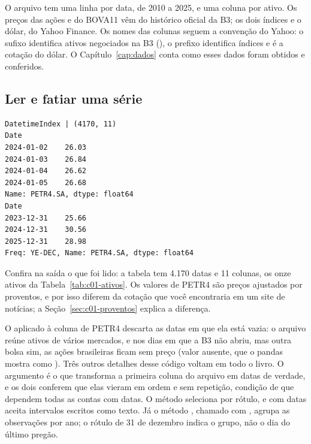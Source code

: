 O arquivo  tem uma linha por data, de 2010 a 2025, e uma coluna por ativo. Os preços das ações e do BOVA11 vêm do histórico oficial da B3; os dois índices e o dólar, do Yahoo Finance. Os nomes das colunas seguem a convenção do Yahoo: o sufixo  identifica ativos negociados na B3 (), o prefixo \cod{\textasciicircum} identifica índices e  é a cotação do dólar. O Capítulo~\ref{cap:dados} conta como esses dados foram obtidos e conferidos.

\subsection{Ler e fatiar uma série}


\begin{lstlisting}[style=saida]
DatetimeIndex | (4170, 11)
Date
2024-01-02    26.03
2024-01-03    26.84
2024-01-04    26.62
2024-01-05    26.68
Name: PETR4.SA, dtype: float64
Date
2023-12-31    25.66
2024-12-31    30.56
2025-12-31    28.98
Freq: YE-DEC, Name: PETR4.SA, dtype: float64
\end{lstlisting}

Confira na saída o que foi lido: a tabela tem 4.170 datas e 11 colunas, os onze ativos da Tabela~\ref{tab:c01-ativos}. Os valores de PETR4 são preços ajustados por proventos, e por isso diferem da cotação que você encontraria em um site de notícias; a Seção~\ref{sec:c01-proventos} explica a diferença.

O  aplicado à coluna de PETR4 descarta as datas em que ela está vazia: o arquivo reúne ativos de vários mercados, e nos dias em que a B3 não abriu, mas outra bolsa sim, as ações brasileiras ficam sem preço (valor ausente, que o pandas mostra como ). Três outros detalhes desse código voltam em todo o livro. O argumento  é o que transforma a primeira coluna do arquivo em datas de verdade, e os dois  conferem que elas vieram em ordem e sem repetição, condição de que dependem todas as contas com datas. O método  seleciona por rótulo, e com datas aceita intervalos escritos como texto. Já o método , chamado com , agrupa as observações por ano; o rótulo de 31 de dezembro indica o grupo, não o dia do último pregão.

